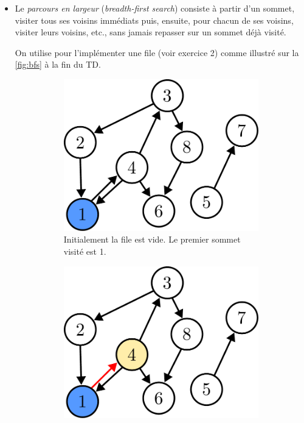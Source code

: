 \documentclass{article}
\begin{document}
\begin{itemize}
	\item Le \emph{parcours en largeur} (\textit{breadth-first search}) consiste à partir d'un sommet, visiter tous ses voisins immédiats puis, ensuite, pour chacun de ses voisins, visiter leurs voisins, etc., sans jamais repasser sur un sommet déjà visité.

	On utilise pour l'implémenter une file (voir exercice 2) comme illustré sur la \autoref{fig:bfs} à la fin du TD.
	
	\begin{figure}[b]
		\caption{Illustration d'un parcours en largeur commençant par le sommet 1}\label{fig:bfs}
		\begin{subfigure}[t]{0.3\linewidth}
			\centering
			\includegraphics[width=0.9\linewidth]{../figures/bfs1.pdf}
			\caption{Initialement la file est vide. Le premier sommet visité est 1.}
		\end{subfigure}\hfill%
		\begin{subfigure}[t]{0.3\linewidth}
			\centering
			\includegraphics[width=0.9\linewidth]{../figures/bfs2.pdf}

\end{subfigure}
\end{figure}
\end{itemize}
\end{document}
